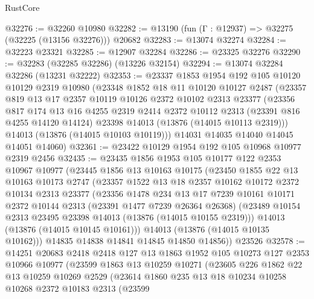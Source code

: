 \begin{lexlean}{RustCore}
\begin{coremodule}
@32276 := @32260 @10980
@32282 := @13190 (fun (Γ : @12937) => @32275 (@32225 (@13156 @32276))) @20682
@32283 := @13074 @32274
@32284 := @32223 @23321
@32285 := @12907 @32284
@32286 := @23325 @32276
@32290 := @32283 (@32285 @32286) (@13226 @32154)
@32294 := @13074 @32284 @32286 (@13231 @32222)
@32353 := @23337
    @1853
    @1954
    @192
    @105
    @10120
    @10129
    @2319
    @10980
    (@23348
      @1852
      @18
      @11
      @10120
      @10127
      @2487
      (@23357
        @819
        @13
        @17
        @2357
        @10119
        @10126
        @2372
        @10102
        @2313
        @23377
        (@23356
          @817
          @174
          @13
          @16
          @4255
          @2319
          @2414
          @2372
          @10112
          @2313
          (@23391 @816 @4255 @14120 @14124)
          @23398
          @14013
          (@13876 (@14015 @10113 @2319)))
        @14013
        (@13876 (@14015 @10103 @10119)))
      @14031
      @14035
      @14040
      @14045
      @14051
      @14060)
@32361 := @23422 @10129 @1954 @192 @105 @10968 @10977 @2319 @2456
@32435 := @23435
    @1856
    @1953
    @105
    @10177
    @122
    @2353
    @10967
    @10977
    (@23445
      @1856
      @13
      @10163
      @10175
      (@23450
        @1855
        @22
        @13
        @10163
        @10173
        @2747
        (@23357
          @1522
          @13
          @18
          @2357
          @10162
          @10172
          @2372
          @10134
          @2313
          @23377
          (@23356
            @1478
            @234
            @13
            @17
            @7239
            @10161
            @10171
            @2372
            @10144
            @2313
            (@23391 @1477 @7239 @26364 @26368)
            (@23489 @10154 @2313 @23495 @23398 @14013 (@13876 (@14015 @10155 @2319)))
            @14013
            (@13876 (@14015 @10145 @10161)))
          @14013
          (@13876 (@14015 @10135 @10162)))
        @14835
        @14838
        @14841
        @14845
        @14850
        @14856))
    @23526
@32578 := @14251
    @20683
    @2418
    @2418
    @127
    @13
    @1863
    @1952
    @105
    @10273
    @127
    @2353
    @10966
    @10977
    (@23599
      @1863
      @13
      @10259
      @10271
      (@23605
        @226
        @1862
        @22
        @13
        @10259
        @10269
        @2529
        (@23614
          @1860
          @235
          @13
          @18
          @10234
          @10258
          @10268
          @2372
          @10183
          @2313
          (@23599

\end{coremodule}
\end{lexlean}

